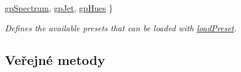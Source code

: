 \begin{DoxyCompactItemize}
\hyperlink{classQCPColorGradient_aed6569828fee337023670272910c9072ad63adc100ef46f6b4a8a6deacec4642f}{gp\+Spectrum}, 
\hyperlink{classQCPColorGradient_aed6569828fee337023670272910c9072a5f8a9e67b64c17ddfe4f069fe2b9fb02}{gp\+Jet}, 
\hyperlink{classQCPColorGradient_aed6569828fee337023670272910c9072a30efe58407acfb67939032f70213a130}{gp\+Hues}
 \}\begin{DoxyCompactList}\small\item\em Defines the available presets that can be loaded with \hyperlink{classQCPColorGradient_aa0aeec1528241728b9671bf8e60b1622}{load\+Preset}. \end{DoxyCompactList}
\end{DoxyCompactItemize}
\subsection*{Veřejné metody}
